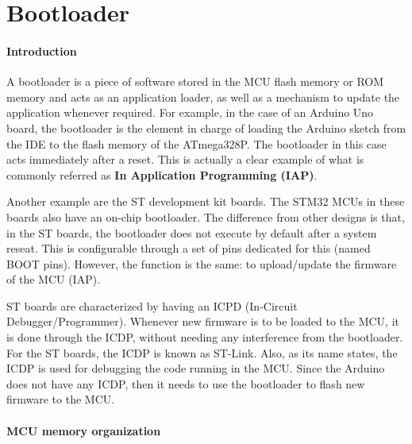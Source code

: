 \chapter{Bootloader}

\subsubsection{Introduction}

A bootloader is a piece of software stored in the MCU flash memory or ROM memory and acts as an application loader, as well as a mechanism to update the application whenever required. For example, in the case of an Arduino Uno board, the bootloader is the element in charge of loading the Arduino sketch from the IDE to the flash memory of the ATmega328P. The bootloader in this case acts immediately after a reset. This is actually a clear example of what is commonly referred as \textbf{In Application Programming (IAP)}.

\noindent Another example are the ST development kit boards. The STM32 MCUs in these boards also have an on-chip bootloader. The difference from other designs is that, in the ST boards, the bootloader does not execute by default after a system reseat. This is configurable through a set of pins dedicated for this (named BOOT pins). However, the function is the same: to upload/update the firmware of the MCU (IAP).

\noindent ST boards are characterized by having an ICPD (In-Circuit Debugger/Programmer). Whenever new firmware is to be loaded to the MCU, it is done through the ICDP, without needing any interference from the bootloader. For the ST boards, the ICDP is known as ST-Link. Also, as its name states, the ICDP is used for debugging the code running in the MCU. Since the Arduino does not have any ICDP, then it needs to use the bootloader to flash new firmware to the MCU.

\subsubsection{MCU memory organization}

















